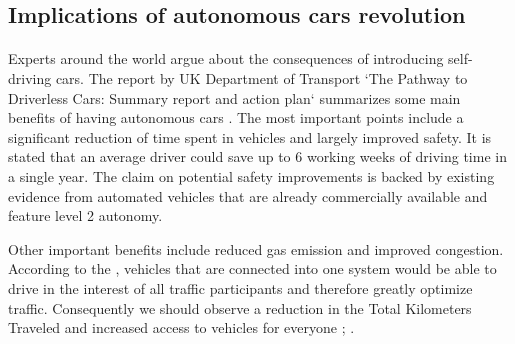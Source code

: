 \documentclass[11pt,english,twoside]{article}
\begin{document}









\subsection{Implications of autonomous cars revolution}



\paragraph{}
Experts around the world argue about the consequences of introducing self-driving cars. The report by UK Department of Transport `The Pathway to Driverless Cars: Summary report and action plan` summarizes some main benefits of having autonomous cars \citep{pathwaytodriverless}. The most important points include a significant reduction of time spent in vehicles and largely improved safety. It is stated that an average driver could save up to 6 working weeks of driving time in a single year. The claim on potential safety improvements is backed by existing evidence from automated vehicles that are already commercially available and feature level 2 autonomy. 
\par
Other important benefits include reduced gas emission and improved congestion. According to the \citet{pathwaytodriverless}, vehicles that are connected into one system would be able to drive in the interest of all traffic participants and therefore greatly optimize traffic. Consequently we should observe a reduction in the Total Kilometers Traveled and increased access to vehicles for everyone \citep{pathwaytodriverless} ; \citep{drivewave}.
\par
\end{document}
